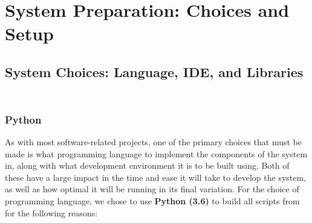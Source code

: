 \documentclass[12pt,twoside]{report}
\begin{document}
\part{System Preparation: Choices and Setup}


\chapter{System Choices: Language, IDE, and Libraries\\~\\}


\section{Python}

\quad As with most software-related projects, one of the primary choices that must be made is what programming language to implement the components of the system in, along with what development environment it is to be built using. Both of these have a large impact in the time and ease it will take to develop the system, as well as how optimal it will be running in its final variation. For the choice of programming language, we chose to use \textbf{Python (3.6)} to build all scripts from for the following reasons:
\end{document}
